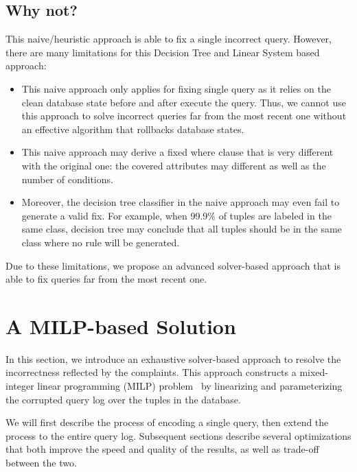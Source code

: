 \subsection{Why not?}
This naive/heuristic approach is able to fix a single incorrect query. However, 
there are many limitations for this Decision Tree and Linear System based approach:
\begin{itemize}
\item This naive approach only applies for fixing single query as it relies on the
clean database state before and after execute the query. Thus, we cannot use
this approach to solve incorrect queries far from the most recent one without 
an effective algorithm that rollbacks database states. 
\item This naive approach may derive a fixed where clause that is very different 
with the original one: the covered attributes may different as well as the number of 
conditions. 
\item Moreover, the decision tree classifier in the naive approach 
may even fail to generate a valid fix. For example, 
when 99.9\% of tuples are labeled
in the same class, decision tree may conclude that all tuples should be in the 
same class where no rule will be generated. 
\end{itemize}
Due to these limitations, we propose an advanced solver-based approach 
that is able to fix queries far from the most recent one. 
\section{A MILP-based Solution}
\label{sec:sol}
In this section, we introduce an exhaustive solver-based approach to 
resolve the incorrectness reflected by the complaints. 
This approach constructs a mixed-integer linear 
programming (MILP) problem~\cite{milp} by linearizing and parameterizing the 
corrupted query log over the tuples in the database. \\
{}


We will first describe the process of encoding a single query,
then extend the process to the entire query log.
Subsequent sections describe several optimizations that  both
improve the speed and quality of the results, as well as trade-off between the two. 




